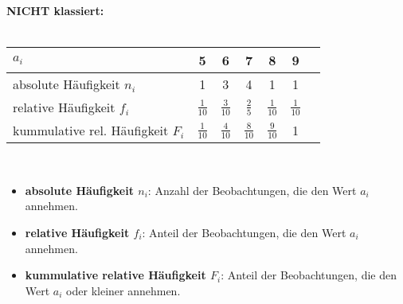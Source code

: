 \begin{concept} {\textbf{NICHT klassiert:}}
    \\\\
    \begin{tabular}{|p{5cm}|c|c|c|c|c|c|}
        \hline
        $a_i$                                              & 5              & 6              & 7              & 8              & 9              \\
        \hline
        \multirow{1}{*}{absolute Häufigkeit $n_i$}         & 1              & 3              & 4              & 1              & 1              \\
        \hline
        \multirow{1}{*}{relative Häufigkeit $f_i$}         & $\frac{1}{10}$ & $\frac{3}{10}$ & $\frac{2}{5}$  & $\frac{1}{10}$ & $\frac{1}{10}$ \\
        \hline
        \multirow{1}{*}{kummulative rel. Häufigkeit $F_i$} & $\frac{1}{10}$ & $\frac{4}{10}$ & $\frac{8}{10}$ & $\frac{9}{10}$ & 1              \\
        \hline
    \end{tabular}
    \\
    \begin{itemize}
        \item \textbf{absolute Häufigkeit $n_i$}: Anzahl der Beobachtungen, die den Wert $a_i$ annehmen.
        \item \textbf{relative Häufigkeit $f_i$}: Anteil der Beobachtungen, die den Wert $a_i$ annehmen.
        \item \textbf{kummulative relative Häufigkeit $F_i$}: Anteil der Beobachtungen, die den Wert $a_i$ oder kleiner annehmen.
    \end{itemize}

    \pgfplotsset{compat=1.17} %



\end{concept}
